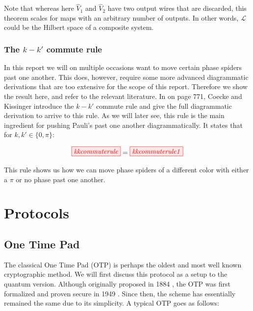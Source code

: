 \documentclass[]{article}
\begin{document}
Note that whereas here $\hat{V}_1$ and $\hat{V}_2$ have two output wires that are discarded, this theorem scales for maps with an arbitrary number of outputs. In other words, $\mathcal{L}$ could be the Hilbert space of a composite system.

\subsubsection{The $k-k'$ commute rule}
\label{section:kkcommute}
In this report we will on multiple occasions want to move certain phase spiders past one another. This does, however, require some more advanced diagrammatic derivations that are too extensive for the scope of this report. Therefore we show the result here, and refer to the relevant literature. In \cite{Coecke2017} on page 771, Coecke and Kissinger introduce the $k-k'$ commute rule and give the full diagrammatic derivation to arrive to this rule. As we will later see, this rule is the main ingredient for pushing Pauli's past one another diagrammatically. It states that for $k, k' \in \{0, \pi\}$: 

\begin{equation}
\label{equation:kkcommuterule}
\tikzfig{kkcommuterule} = \tikzfig{kkcommuterule1}
\end{equation}

This rule shows us how we can move phase spiders of a different color with either a $\pi$ or no phase past one another.

\section{Protocols}


\subsection{One Time Pad}

The classical One Time Pad (OTP) is perhaps the oldest and most well known cryptographic method. We will first discuss this protocol as a setup to the quantum version. Although originally proposed in 1884 \cite{Markoff2011}, the OTP was first formalized and proven secure in 1949 \cite{Shannon1949}. Since then, the scheme has essentially remained the same due to its simplicity. A typical OTP goes as follows:
\end{document}
